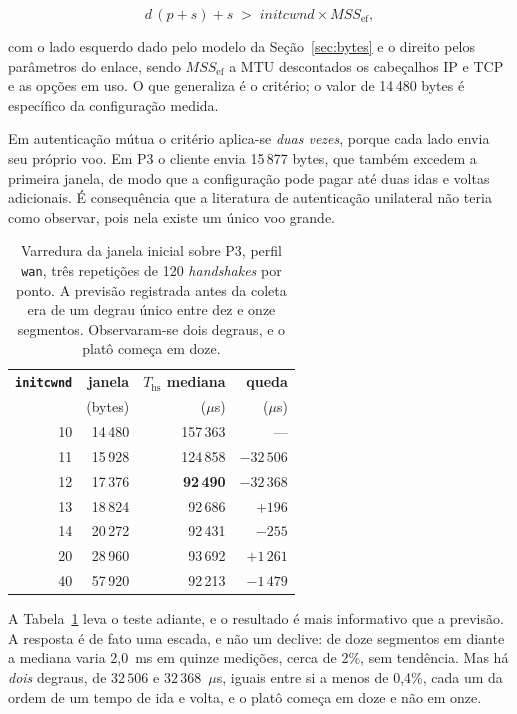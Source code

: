 \documentclass[conference]{IEEEtran}
\begin{document}
\begin{equation}
d\,(p + s) + s \;>\; \mathit{initcwnd} \times \mathit{MSS}_{\mathrm{ef}} ,
\label{eq:limiar}
\end{equation}

\noindent
com o lado esquerdo dado pelo modelo da Seção~\ref{sec:bytes} e o direito pelos
parâmetros do enlace, sendo $\mathit{MSS}_{\mathrm{ef}}$ a MTU descontados os
cabeçalhos IP e TCP e as opções em uso. O que generaliza é o critério; o valor de
14\,480 bytes é específico da configuração medida.

Em autenticação mútua o critério aplica-se \emph{duas vezes}, porque cada lado
envia seu próprio voo. Em P3 o cliente envia 15\,877 bytes, que também excedem a
primeira janela, de modo que a configuração pode pagar até duas idas e voltas
adicionais. É consequência que a literatura de autenticação unilateral não teria
como observar, pois nela existe um único voo grande.

\begin{table}[!t]
\caption{Varredura da janela inicial sobre P3, perfil \texttt{wan}, três
repetições de 120 \textit{handshakes} por ponto. A previsão registrada antes da
coleta era de um degrau único entre dez e onze segmentos. Observaram-se dois
degraus, e o platô começa em doze.}
\label{tab:varredura}
\centering
\footnotesize
\begin{tabular}{@{}rrrr@{}}
\toprule
\textbf{\texttt{initcwnd}} & \textbf{janela} & \textbf{$T_{\mathrm{hs}}$ mediana}
 & \textbf{queda} \\
 & (bytes) & ($\mu$s) & ($\mu$s) \\
\midrule
10 & 14\,480 & 157\,363 & --- \\
11 & 15\,928 & 124\,858 & $-32\,506$ \\
12 & 17\,376 & \textbf{92\,490} & $-32\,368$ \\
13 & 18\,824 & 92\,686 & $+196$ \\
14 & 20\,272 & 92\,431 & $-255$ \\
20 & 28\,960 & 93\,692 & $+1\,261$ \\
40 & 57\,920 & 92\,213 & $-1\,479$ \\
\bottomrule
\end{tabular}
\end{table}

A Tabela~\ref{tab:varredura} leva o teste adiante, e o resultado é mais
informativo que a previsão. A resposta é de fato uma escada, e não um declive: de
doze segmentos em diante a mediana varia 2,0~ms em quinze medições, cerca de 2\%,
sem tendência. Mas há \emph{dois} degraus, de $32\,506$ e $32\,368$~$\mu$s,
iguais entre si a menos de 0,4\%, cada um da ordem de um tempo de ida e volta, e
o platô começa em doze e não em onze.
\end{document}
